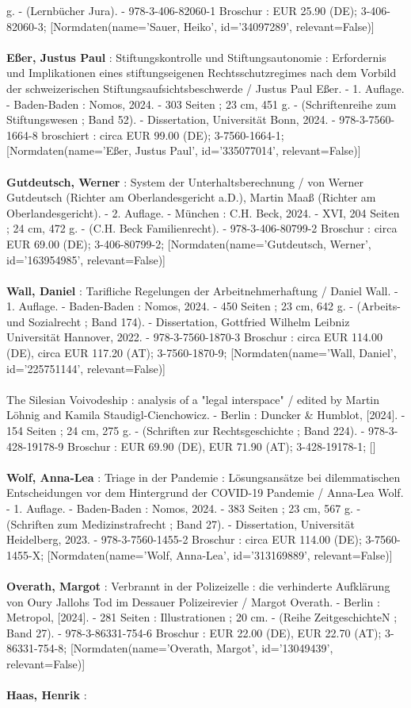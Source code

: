 \documentclass{article}
\begin{document}
\begin{multicols}{3}
g. - (Lernbücher Jura). - 978-3-406-82060-1 Broschur : EUR 25.90 (DE); 3-406-82060-3; [Normdaten(name='Sauer, Heiko', id='34097289', relevant=False)]\\\\\textbf{Eßer, Justus Paul} : Stiftungskontrolle und Stiftungsautonomie : Erfordernis und Implikationen eines stiftungseigenen Rechtsschutzregimes nach dem Vorbild der schweizerischen Stiftungsaufsichtsbeschwerde / Justus Paul Eßer. - 1. Auflage. - Baden-Baden : Nomos, 2024. - 303 Seiten ; 23 cm, 451 g. - (Schriftenreihe zum Stiftungswesen ; Band 52). - Dissertation, Universität Bonn, 2024. - 978-3-7560-1664-8 broschiert : circa EUR 99.00 (DE); 3-7560-1664-1; [Normdaten(name='Eßer, Justus Paul', id='335077014', relevant=False)]\\\\\textbf{Gutdeutsch, Werner} : System der Unterhaltsberechnung / von Werner Gutdeutsch (Richter am Oberlandesgericht a.D.), Martin Maaß (Richter am Oberlandesgericht). - 2. Auflage. - München : C.H. Beck, 2024. - XVI, 204 Seiten ; 24 cm, 472 g. - (C.H. Beck Familienrecht). - 978-3-406-80799-2 Broschur : circa EUR 69.00 (DE); 3-406-80799-2; [Normdaten(name='Gutdeutsch, Werner', id='163954985', relevant=False)]\\\\\textbf{Wall, Daniel} : Tarifliche Regelungen der Arbeitnehmerhaftung / Daniel Wall. - 1. Auflage. - Baden-Baden : Nomos, 2024. - 450 Seiten ; 23 cm, 642 g. - (Arbeits- und Sozialrecht ; Band 174). - Dissertation, Gottfried Wilhelm Leibniz Universität Hannover, 2022. - 978-3-7560-1870-3 Broschur : circa EUR 114.00 (DE), circa EUR 117.20 (AT); 3-7560-1870-9; [Normdaten(name='Wall, Daniel', id='225751144', relevant=False)]\\\\The Silesian Voivodeship : analysis of a "legal interspace" / edited by Martin Löhnig and Kamila Staudigl-Cienchowicz. - Berlin : Duncker \& Humblot, [2024]. - 154 Seiten ; 24 cm, 275 g. - (Schriften zur Rechtsgeschichte ; Band 224). - 978-3-428-19178-9 Broschur : EUR 69.90 (DE), EUR 71.90 (AT); 3-428-19178-1; []\\\\\textbf{Wolf, Anna-Lea} : Triage in der Pandemie : Lösungsansätze bei dilemmatischen Entscheidungen vor dem Hintergrund der COVID-19 Pandemie / Anna-Lea Wolf. - 1. Auflage. - Baden-Baden : Nomos, 2024. - 383 Seiten ; 23 cm, 567 g. - (Schriften zum Medizinstrafrecht ; Band 27). - Dissertation, Universität Heidelberg, 2023. - 978-3-7560-1455-2 Broschur : circa EUR 114.00 (DE); 3-7560-1455-X; [Normdaten(name='Wolf, Anna-Lea', id='313169889', relevant=False)]\\\\\textbf{Overath, Margot} : Verbrannt in der Polizeizelle : die verhinderte Aufklärung von Oury Jallohs Tod im Dessauer Polizeirevier / Margot Overath. - Berlin : Metropol, [2024]. - 281 Seiten : Illustrationen ; 20 cm. - (Reihe ZeitgeschichteN ; Band 27). - 978-3-86331-754-6 Broschur : EUR 22.00 (DE), EUR 22.70 (AT); 3-86331-754-8; [Normdaten(name='Overath, Margot', id='13049439', relevant=False)]\\\\\textbf{Haas, Henrik} : 
\end{multicols}
\end{document}
